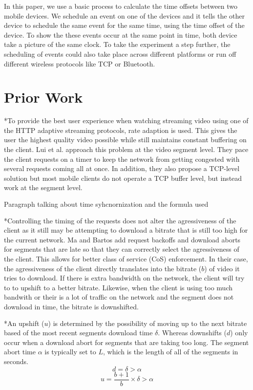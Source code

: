 \documentclass[10pt]{IEEEtran}
\begin{document}
In this paper, we use a basic process to calculate the time offsets between two
mobile devices. We schedule an event on one of the devices and it tells the
other device to schedule the same event for the same time, using the time offset
of the device. To show the these events occur at the same point in time, both
device take a picture of the same clock. To take the experiment a step further,
the scheduling of events could also take place across different platforms or run
off different wireless protocols like TCP or Bluetooth.

\section{Prior Work}

*To provide the best user experience when watching streaming video using one of
the HTTP adaptive streaming protocols, rate adaption is used. This gives the
user the highest quality video possible while still maintains constant buffering
on the client. Lui et al. \cite{rate} approach this problem at the video segment level. 
They pace the client requests on a timer to keep the network from getting
congested with several requests coming all at once. In addition, they also 
propose a TCP-level solution but most mobile clients do not operate a TCP buffer
level, but instead work at the segment level.

Paragraph talking about time syhcnornization and the formula used

*Controlling the timing of the requests does not alter the agressiveness of the
client as it still may be attempting to download a bitrate that is still too
high for the current network. Ma and Bartos \cite{cos} add request backoffs and download 
aborts for segments that are late so that they can correctly select the 
agressiveness of the client. This allows for better class of service (CoS) 
enforcement. In their case, the agressiveness of the client directly translates 
into the bitrate ($b$) of video it tries to download. If there is extra 
bandwidth on the network, the client will try to to upshift to a better bitrate. 
Likewise, when the client is using too much bandwith or their is a lot of 
traffic on the network and the segment does not download in time, the bitrate is 
downshifted.

*An upshift ($u$) is determined by the possibility of moving up to the next bitrate
based of the most recent segments download time $\delta$. Whereas downshifts 
($d$) only occur when a download abort for segments that are taking too long. 
The segment abort time $\alpha$ is typically set to $L$, which is the length of 
all of the segments in seconds.
\begin{equation}
    d = \delta > \alpha
\end {equation}
\begin{equation}
    u = \frac{b+1}{b} \times \delta > \alpha
\end {equation}
\end{document}
